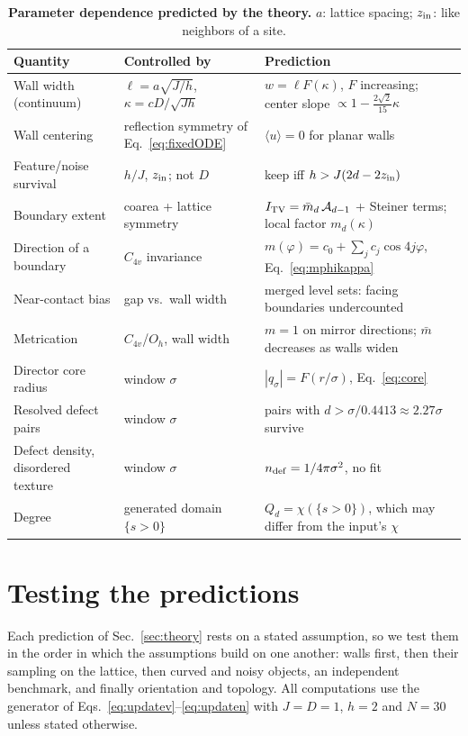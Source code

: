 \documentclass[11pt,a4paper]{article}
\begin{document}
\begin{table}[t]
\centering\caption{\textbf{Parameter dependence predicted by the theory.} $a$: lattice spacing; $z_{\rm in}$: like neighbors of a site.}\label{tab:depend}
\small\begin{tabularx}{\linewidth}{@{}p{.3\linewidth}p{.27\linewidth}X@{}}\toprule
Quantity & Controlled by & Prediction\\\midrule
Wall width (continuum) & $\ell=a\sqrt{J/h}$, $\kappa=cD/\sqrt{Jh}$ & $w=\ell F(\kappa)$, $F$ increasing; center slope $\propto1-\tfrac{2\sqrt2}{15}\kappa$\\
Wall centering & reflection symmetry of Eq.~\eqref{eq:fixedODE} & $\langle u\rangle=0$ for planar walls\\
Feature/noise survival & $h/J$, $z_{\rm in}$; not $D$ & keep iff $h>J(2d-2z_{\rm in})$\\
Boundary extent & coarea + lattice symmetry & $I_{\rm TV}=\bar m_d\,\mathcal A_{d-1}$ + Steiner terms; local factor $m_d(\kappa)$\\
Direction of a boundary & $C_{4v}$ invariance & $m(\varphi)=c_0+\sum_j c_j\cos4j\varphi$, Eq.~\eqref{eq:mphikappa}\\
Near-contact bias & gap vs.\ wall width & merged level sets: facing boundaries undercounted\\
Metrication & $C_{4v}$/$O_h$, wall width & $m=1$ on mirror directions; $\bar m$ decreases as walls widen\\
Director core radius & window $\sigma$ & $|q_\sigma|=F(r/\sigma)$, Eq.~\eqref{eq:core}\\
Resolved defect pairs & window $\sigma$ & pairs with $d>\sigma/0.4413\approx2.27\sigma$ survive\\
Defect density, disordered texture & window $\sigma$ & $n_{\rm def}=1/4\pi\sigma^2$, no fit\\
Degree & generated domain $\{s>0\}$ & $Q_d=\chi(\{s>0\})$, which may differ from the input's $\chi$\\\bottomrule
\end{tabularx}
\end{table}

\FloatBarrier
\section{Testing the predictions}\label{sec:results}
Each prediction of Sec.~\ref{sec:theory} rests on a stated assumption, so we test them in the order in which the assumptions build on one another: walls first, then their sampling on the lattice, then curved and noisy objects, an independent benchmark, and finally orientation and topology. All computations use the generator of Eqs.~\eqref{eq:updatev}--\eqref{eq:updaten} with $J=D=1$, $h=2$ and $N=30$ unless stated otherwise.
\end{document}
